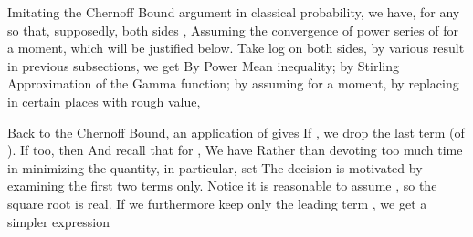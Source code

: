 Imitating the Chernoff Bound argument in classical probability, we have, for any  so that, supposedly, both sides \m {< \infty},
Assuming the convergence of power series of  for a moment, which will be justified below.
Take log on both sides, by various result in previous subsections, we get
By Power Mean inequality;
by Stirling Approximation of the Gamma function;
by assuming  for a moment, by replacing  in certain places with rough value,

Back to the Chernoff Bound, an application of  gives
If , we drop the last term (of ).
If  too, then
And recall that for ,
We have
Rather than devoting too much time in minimizing the quantity, in particular, set
The decision is motivated by examining the first two terms only.
Notice it is reasonable to assume , so the square root is real.
If we furthermore keep only the leading term , we get a simpler expression

